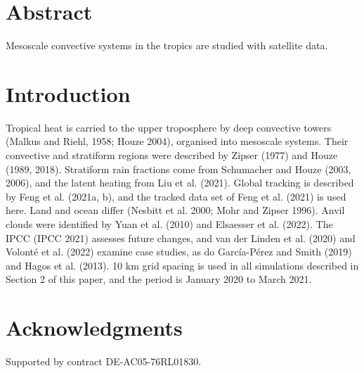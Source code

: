 \documentclass[12pt]{article}
\begin{document}
\section*{Abstract}
Mesoscale convective systems in the tropics are studied with satellite data.

\section{Introduction}
Tropical heat is carried to the upper troposphere by deep convective towers
(Malkus and Riehl, 1958; Houze 2004), organised into mesoscale systems.
Their convective and stratiform regions were described by Zipser (1977) and
Houze (1989, 2018). Stratiform rain fractions come from Schumacher and
Houze (2003, 2006), and the latent heating from Liu et al. (2021).
Global tracking is described by Feng et al. (2021a, b), and the tracked data set
of Feng et al. (2021) is used here. Land and ocean differ (Nesbitt et al. 2000;
Mohr and Zipser 1996). Anvil clouds were identified by Yuan et al. (2010) and
Elsaesser et al. (2022). The IPCC (IPCC 2021) assesses future changes, and
van der Linden et al. (2020) and Volonté et al. (2022) examine case studies,
as do García-Pérez and Smith (2019) and Hagos et al. (2013).
10 km grid spacing is used in all simulations described in Section 2 of this
paper, and the period is January 2020 to March 2021.

\section{Acknowledgments}
Supported by contract DE-AC05-76RL01830.
\end{document}
